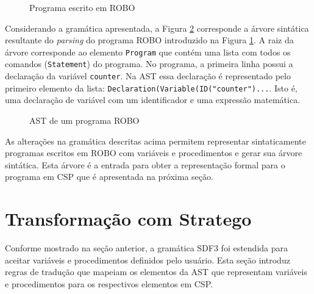 \begin{figure}[h]
\caption{Programa escrito em ROBO}

\label{fig:roboprogram}
\end{figure}

Considerando a gramática apresentada, a Figura \ref{fig:ast1} corresponde a árvore sintática resultante do \textit{parsing} do programa ROBO introduzido na Figura \ref{fig:roboprogram}. A raiz da árvore corresponde ao elemento \texttt{Program} que contém uma lista com todos os comandos (\texttt{Statement}) do programa. No programa, a primeira linha possui a declaração da variável \texttt{counter}. Na AST essa declaração é representado pelo primeiro elemento da lista: \texttt{Declaration(Variable(ID("counter")...}. Isto é, uma declaração de variável com um identificador e uma expressão matemática.

\begin{figure}[h]
\centering
\caption{AST de um programa ROBO}

\label{fig:ast1}
\end{figure}

As alterações na gramática descritas acima permitem representar sintaticamente programas escritos em ROBO com variáveis e procedimentos e gerar sua árvore sintática. Esta árvore é a entrada para obter a representação formal para o programa em CSP que é apresentada na próxima seção.

\section{Transformação com Stratego}



Conforme mostrado na seção anterior, a gramática SDF3 foi estendida para aceitar variáveis e procedimentos definidos pelo usuário. Esta seção introduz regras de tradução que mapeiam os elementos da AST que representam variáveis e procedimentos para os respectivos elementos em CSP. 

